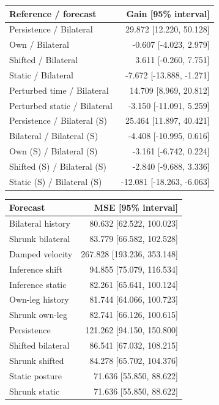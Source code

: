 \documentclass[letterpaper]{article}
\begin{document}
\begin{center}\begin{minipage}{\columnwidth}
\centering
\small
\begin{tabular}{lr}
\toprule
Reference / forecast & Gain [95\% interval] \\
\midrule
Persistence / Bilateral & 29.872 [12.220, 50.128] \\
Own / Bilateral & -0.607 [-4.023, 2.979] \\
Shifted / Bilateral & 3.611 [-0.260, 7.751] \\
Static / Bilateral & -7.672 [-13.888, -1.271] \\
Perturbed time / Bilateral & 14.709 [8.969, 20.812] \\
Perturbed static / Bilateral & -3.150 [-11.091, 5.259] \\
Persistence / Bilateral (S) & 25.464 [11.897, 40.421] \\
Bilateral / Bilateral (S) & -4.408 [-10.995, 0.616] \\
Own (S) / Bilateral (S) & -3.161 [-6.742, 0.224] \\
Shifted (S) / Bilateral (S) & -2.840 [-9.688, 3.336] \\
Static (S) / Bilateral (S) & -12.081 [-18.263, -6.063] \\
\bottomrule
\end{tabular}
\end{minipage}\end{center}

\begin{center}\begin{minipage}{\columnwidth}
\centering
\small
\begin{tabular}{lr}
\toprule
Forecast & MSE [95\% interval] \\
\midrule
Bilateral history & 80.632 [62.522, 100.023] \\
Shrunk bilateral & 83.779 [66.582, 102.528] \\
Damped velocity & 267.828 [193.236, 353.148] \\
Inference shift & 94.855 [75.079, 116.534] \\
Inference static & 82.261 [65.641, 100.124] \\
Own-leg history & 81.744 [64.066, 100.723] \\
Shrunk own-leg & 82.741 [66.126, 100.615] \\
Persistence & 121.262 [94.150, 150.800] \\
Shifted bilateral & 86.541 [67.032, 108.215] \\
Shrunk shifted & 84.278 [65.702, 104.376] \\
Static posture & 71.636 [55.850, 88.622] \\
Shrunk static & 71.636 [55.850, 88.622] \\
\bottomrule
\end{tabular}
\end{minipage}\end{center}
\end{document}
